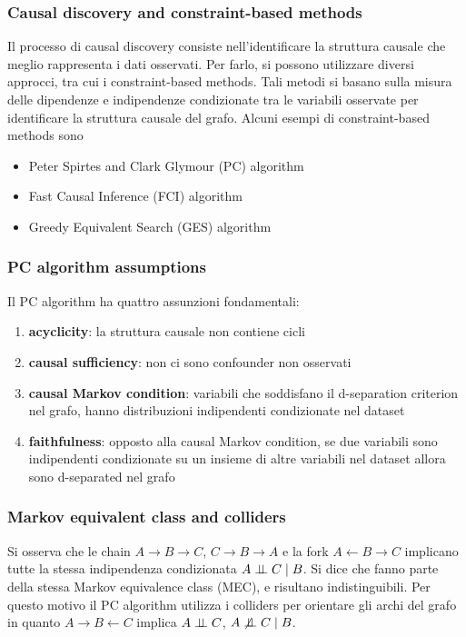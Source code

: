 \subsubsection*{Causal discovery and constraint-based methods}
Il processo di causal discovery consiste nell'identificare la struttura causale che meglio rappresenta i dati osservati. Per
farlo, si possono utilizzare diversi approcci, tra cui i constraint-based methods. Tali metodi si basano sulla misura delle
dipendenze e indipendenze condizionate tra le variabili osservate per identificare la struttura causale del grafo.
Alcuni esempi di constraint-based methods sono
\begin{itemize}
	\item Peter Spirtes and Clark Glymour (PC) algorithm
	\item Fast Causal Inference (FCI) algorithm
	\item Greedy Equivalent Search (GES) algorithm
\end{itemize} 

\subsubsection*{PC algorithm assumptions}
Il PC algorithm ha quattro assunzioni fondamentali:
\begin{enumerate}
	\item \textbf{acyclicity}: la struttura causale non contiene cicli
	\item \textbf{causal sufficiency}: non ci sono confounder non osservati
	\item \textbf{causal Markov condition}: variabili che soddisfano il d-separation criterion nel grafo, hanno distribuzioni
	indipendenti condizionate nel dataset
	\item \textbf{faithfulness}: opposto alla causal Markov condition, se due variabili sono indipendenti condizionate su un
	insieme di altre variabili nel dataset allora sono d-separated nel grafo
\end{enumerate}

\subsubsection*{Markov equivalent class and colliders}
Si osserva che le chain \(A \to B \to C\), \(C \to B \to A\) e la fork \(A \leftarrow B \to C\) implicano tutte la stessa
indipendenza condizionata \(A \perp \!\!\! \perp C \mid B\). Si dice che fanno parte della stessa Markov equivalence class (MEC),
e risultano indistinguibili. Per questo motivo il PC algorithm utilizza i colliders per orientare gli archi del grafo
in quanto \(A \to B \leftarrow C\) implica \(A \perp \!\!\! \perp C\), \(A \not \perp \!\!\! \perp C \mid B\).

